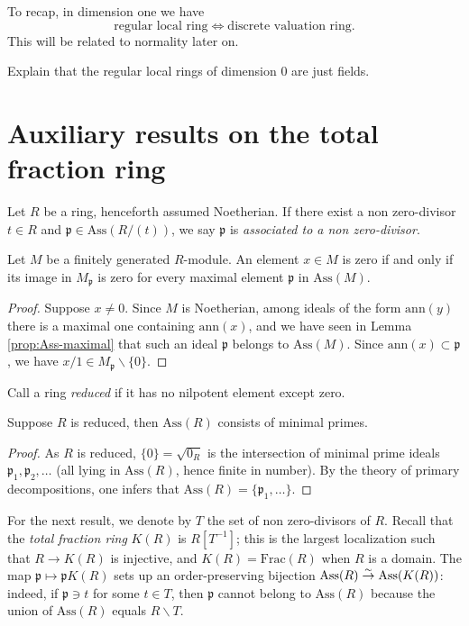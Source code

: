 To recap, in dimension one we have
\[ \text{regular local ring} \iff \text{discrete valuation ring}. \]
This will be related to normality later on.

\begin{exercise}
	Explain that the regular local rings of dimension $0$ are just fields.
\end{exercise}

\section{Auxiliary results on the total fraction ring}
Let $R$ be a ring, henceforth assumed Noetherian. If there exist a non zero-divisor $t \in R$ and $\mathfrak{p} \in \text{Ass}(R/(t))$, we say $\mathfrak{p}$ is \emph{associated to a non zero-divisor}.

\begin{lemma}\label{prop:zero-test-ass}
	Let $M$ be a finitely generated $R$-module. An element $x \in M$ is zero if and only if its image in $M_{\mathfrak{p}}$ is zero for every maximal element $\mathfrak{p}$ in $\mathrm{Ass}(M)$.
\end{lemma}
\begin{proof}
	Suppose $x \neq 0$. Since $M$ is Noetherian, among ideals of the form $\text{ann}(y)$ there is a maximal one containing $\text{ann}(x)$, and we have seen in Lemma \ref{prop:Ass-maximal} that such an ideal $\mathfrak{p}$ belongs to $\text{Ass}(M)$. Since $\text{ann}(x) \subset \mathfrak{p}$, we have $x/1 \in M_{\mathfrak{p}} \smallsetminus \{0\}$.
\end{proof}

Call a ring \emph{reduced} if it has no nilpotent element except zero.
\begin{lemma}
	Suppose $R$ is reduced, then $\mathrm{Ass}(R)$ consists of minimal primes.
\end{lemma}
\begin{proof}
	As $R$ is reduced, $\{0\} = \sqrt{0_R}$ is the intersection of minimal prime ideals $\mathfrak{p}_1, \mathfrak{p}_2, \ldots$ (all lying in $\text{Ass}(R)$, hence finite in number). By the theory of primary decompositions, one infers that $\text{Ass}(R) = \{\mathfrak{p}_1, \ldots \}$.
\end{proof}

For the next result, we denote by $T$ the set of non zero-divisors of $R$. Recall that the \emph{total fraction ring} $K(R)$ is $R[T^{-1}]$; this is the largest localization such that $R \to K(R)$ is injective, and $K(R) = \text{Frac}(R)$ when $R$ is a domain. The map $\mathfrak{p} \mapsto \mathfrak{p}K(R)$ sets up an order-preserving bijection $\text{Ass}(R) \stackrel{\sim}{\rightarrow} \text{Ass}(K(R))$: indeed, if $\mathfrak{p} \ni t$ for some $t \in T$, then $\mathfrak{p}$ cannot belong to $\text{Ass}(R)$ because the union of $\text{Ass}(R)$ equals $R \smallsetminus T$.

